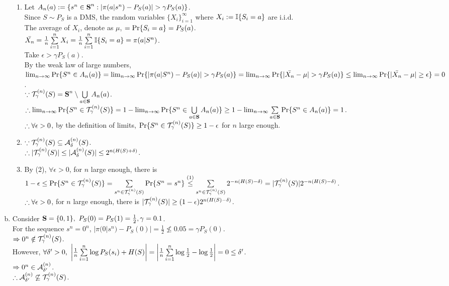 \begin{pr}
\begin{enumerate}[(a)]
\begin{enumerate}[(1)]
\item Let $A_n(a):=\{s^n\in\S^n:|\pi(a|s^n)-P_S(a)|>\gamma P_S(a)\}$.\\
Since $S\sim P_S$ is a DMS, the random variables $\{X_i\}_{i=1}^\infty$ where $X_i:=\I\{S_i=a\}$ are i.i.d.\\
The average of $X_i$, denote as $\mu$, $=\P\{S_i=a\}=P_S(a)$.\\
$\bar{X_n}=\frac1n\suml_{i=1}^nX_i=\frac1n\suml_{i=1}^n\I\{S_i=a\}=\pi(a|S^n)$.\\
Take $\epsilon>\gamma P_S(a)$.\\
By the weak law of large numbers, $\lim_{n\to\infty}\P\{S^n\in A_n(a)\}=\lim_{n\to\infty}\P\{|\pi(a|S^n)-P_S(a)|>\gamma P_S(a)\}=\lim_{n\to\infty}\P\{|\bar{X_n}-\mu|>\gamma P_S(a)\}\leq\lim_{n\to\infty}\P\{|\bar{X_n}-\mu|\geq\epsilon\}=0$.\\
$\cuz\T=\S^n\setminus\cupl_{a\in\S}A_n(a)$.\\
$\so\lim_{n\to\infty}\P\{S^n\in\T\}=1-\lim_{n\to\infty}\P\{S^n\in\cupl_{a\in\S}A_n(a)\}\geq1-\lim_{n\to\infty}\suml_{a\in\S}\P\{S^n\in A_n(a)\}=1$.\\
$\so\forall\epsilon>0$, by the definition of limits, $\P\{S^n\in\T\}\geq1-\epsilon$ for $n$ large enough.

\item $\cuz\T\subseteq\A$.\\
$\so|\T|\leq|\A|\leq2^{n(H(S)+\delta)}$.

\item By (2), $\forall\epsilon>0$, for $n$ large enough, there is $1-\epsilon\leq\P\{S^n\in\T\}=\suml_{s^n\in\T}\P\{S^n=s^n\}\overtext{(1)}\leq\suml_{s^n\in\T}2^{-n(H(S)-\delta)}=|\T|2^{-n(H(S)-\delta)}$.\\
$\so\forall\epsilon>0$, for $n$ large enough, there is $|\T|\geq(1-\epsilon)2^{n(H(S)-\delta)}$.

\end{enumerate}

\setcounter{enumi}{2}

\item Consider $\S=\{0, 1\},\ P_S(0)=P_S(1)=\frac12, \gamma=0.1$.\\
For the sequence $s^n=0^n$, $|\pi(0|s^n)-P_S(0)|=\frac12\not\leq0.05=\gamma P_S(0)$.\\
$\then0^n\notin\T$.\\
However, $\forall\delta'>0,\ \left|\frac1n\suml_{i=1}^n\log P_S(s_i)+H(S)\right|=\left|\frac1n\suml_{i=1}^n\log\frac12-\log\frac12\right|=0\leq\delta'$.\\
$\then0^n\in\mathcal{A}_{\delta'}^{(n)}$.\\
$\so\mathcal{A}_{\delta'}^{(n)}\not\subseteq\T$.

\end{enumerate}

\end{pr}
